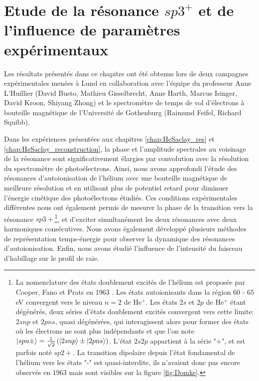 \chapter[Etude de la résonance $sp3^+$ et de l'influence de paramètres expérimentaux]{Etude de la résonance \MakeLowercase{$sp3^+$} et de l'influence de paramètres expérimentaux}
\label{chap:He_Lund}
Les résultats présentés dans ce chapitre ont été obtenus lors de deux campagnes expérimentales menées à Lund en collaboration avec l'équipe du professeur Anne L'Huillier (David Busto, Mathieu Gisselbrecht, Anne Harth, Marcus Isinger, David Kroon, Shiyang Zhong) et le spectromètre de temps de vol d'électrons à bouteille magnétique de l'Université de Gothenburg (Raimund Feifel, Richard Squibb).


Dans les expériences présentées aux chapitres \ref{chap:HeSaclay_res} et \ref{chap:HeSaclay_reconstruction}, la phase et l'amplitude spectrales au voisinage de la résonance sont significativement élargies par convolution avec la résolution du spectromètre de photoélectrons. Ainsi, nous avons approfondi l'étude des résonances d'autoionisation de l'hélium avec une bouteille magnétique de meilleure résolution et en utilisant plus de potentiel retard pour diminuer l'énergie cinétique des photoélectrons étudiés. Ces conditions expérimentales différentes nous ont également permis de mesurer la phase de la transition vers la résonance $sp3+$\footnote{La nomenclature des états doublement excités de l'hélium est proposée par Cooper, Fano et Prats en 1963 . Les états autoionisants dans la région 60 - 65 eV convergent vers le niveau $n = 2$ de He$^+$. Les états $2s$ et $2p$ de He$^+$ étant dégénérés, deux séries d'états doublement excités convergent vers cette limite: $2snp$ et $2pns$, quasi dégénérées, qui interagissent alors pour former des états où les électrons ne sont plus indépendants et que l'on note $\ket{spn \pm} = \frac{1}{\sqrt{2}} \left( \ket{2snp} \pm \ket{2pns} \right)$. L'état $2s2p$ appartient à la série "+", et est parfois noté $sp2+$. La transition dipolaire depuis l'état fondamental de l'hélium vers les états "-" est quasi-interdite, ils n'avaient donc pas encore observés en 1963 mais sont visibles sur la figure \ref{fig:Domke}.}, et d'exciter simultanément les deux résonances avec deux harmoniques consécutives. Nous avons également développé plusieurs méthodes de représentation temps-énergie pour observer la dynamique des résonances d'autoionisation. Enfin, nous avons étudié l'influence de l'intensité du faisceau d'habillage sur le profil de raie.

